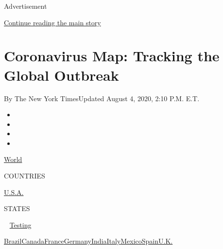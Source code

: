 Advertisement

\protect\hyperlink{after-top}{Continue reading the main story}

\hypertarget{coronavirus-map-tracking-the-global-outbreak}{%
\section{Coronavirus Map: Tracking the Global
Outbreak}\label{coronavirus-map-tracking-the-global-outbreak}}

By The New York TimesUpdated August 4, 2020, 2:10 P.M. E.T.

\begin{itemize}
\item
\item
\item
\item
\end{itemize}

\href{https://www.nytimes.com/interactive/2020/world/coronavirus-maps.html}{World}~

COUNTRIES

\textbar{}
\href{https://www.nytimes.com/interactive/2020/us/coronavirus-us-cases.html}{U.S.A.}~

STATES

~
\href{https://www.nytimes.com/interactive/2020/us/coronavirus-testing.html}{Testing}

\href{https://www.nytimes.com/interactive/2020/world/americas/brazil-coronavirus-cases.html}{Brazil}\href{https://www.nytimes.com/interactive/2020/world/canada/canada-coronavirus-cases.html}{Canada}\href{https://www.nytimes.com/interactive/2020/world/europe/france-coronavirus-cases.html}{France}\href{https://www.nytimes.com/interactive/2020/world/europe/germany-coronavirus-cases.html}{Germany}\href{https://www.nytimes.com/interactive/2020/world/asia/india-coronavirus-cases.html}{India}\href{https://www.nytimes.com/interactive/2020/world/europe/italy-coronavirus-cases.html}{Italy}\href{https://www.nytimes.com/interactive/2020/world/americas/mexico-coronavirus-cases.html}{Mexico}\href{https://www.nytimes.com/interactive/2020/world/europe/spain-coronavirus-cases.html}{Spain}\href{https://www.nytimes.com/interactive/2020/world/europe/united-kingdom-coronavirus-cases.html}{U.K.}

